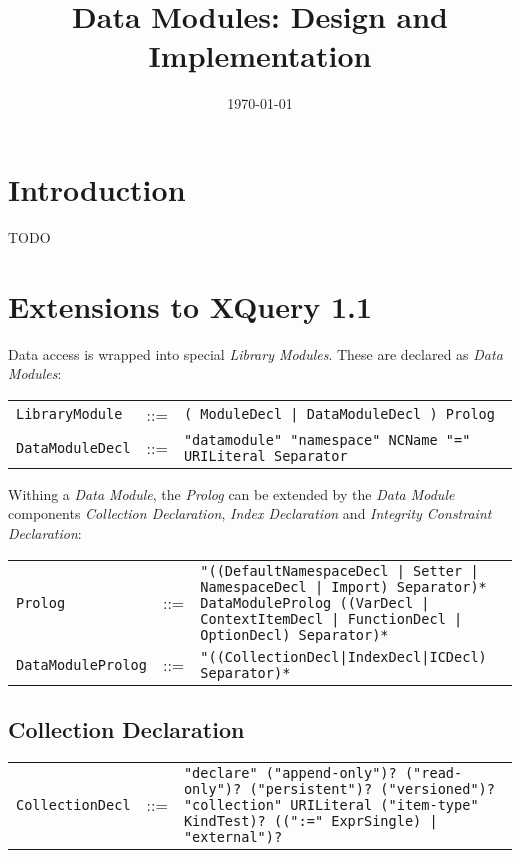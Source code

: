 \documentclass[]{article}
\title{Data Modules: Design and Implementation}
\author{  }
\date{\today}
\begin{document}
\ifpdf
{}
\else
{}
\fi

\maketitle



\section{Introduction}
TODO 


\section{Extensions to XQuery 1.1}
Data access is wrapped into special \textit{Library Modules}. These are declared as \textit{Data Modules}:

\vspace{0.25cm}
\begin{tabular}{l c p{12cm}}
{\tt LibraryModule}  & ::= & {\tt ( ModuleDecl | DataModuleDecl ) Prolog} \\
{\tt DataModuleDecl} & ::= & {\tt "datamodule" "namespace" NCName "=" URILiteral\ Separator}
\end{tabular}

\vspace{0.5cm}
\noindent
Withing a \textit{Data Module}, the \textit{Prolog} can be extended by the \textit{Data Module} components \textit{Collection Declaration}, \textit{Index Declaration} and \textit{Integrity Constraint Declaration}:
\par
\vspace{0.25cm}
\begin{tabular}{l c p{12cm}}
{\tt Prolog}           & ::= & {\tt "((DefaultNamespaceDecl | Setter | NamespaceDecl | Import) Separator)* DataModuleProlog ((VarDecl | ContextItemDecl | FunctionDecl | OptionDecl) Separator)*} \\
{\tt DataModuleProlog} & ::= & {\tt "((CollectionDecl|IndexDecl|ICDecl) Separator)*} 
\end{tabular}

\subsection{Collection Declaration}
\begin{tabular}{l c p{12cm}}
{\tt CollectionDecl} & ::= & {\tt "declare" ("append-only")? ("read-only")? ("persistent")? ("versioned")? "collection" URILiteral ("item-type" KindTest)? ((":=" ExprSingle) | "external")?}
\end{tabular}
\end{document}
